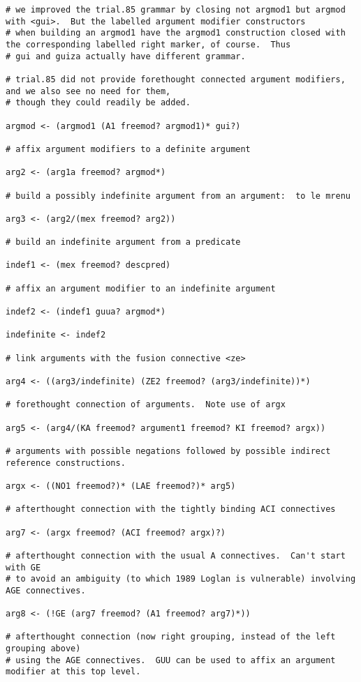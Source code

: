 \documentclass[12pt]{book}
\begin{document}
{\begin{verbatim}
# we improved the trial.85 grammar by closing not argmod1 but argmod with <gui>.  But the labelled argument modifier constructors
# when building an argmod1 have the argmod1 construction closed with the corresponding labelled right marker, of course.  Thus
# gui and guiza actually have different grammar.

# trial.85 did not provide forethought connected argument modifiers, and we also see no need for them,
# though they could readily be added.

argmod <- (argmod1 (A1 freemod? argmod1)* gui?)

# affix argument modifiers to a definite argument

arg2 <- (arg1a freemod? argmod*)

# build a possibly indefinite argument from an argument:  to le mrenu

arg3 <- (arg2/(mex freemod? arg2))

# build an indefinite argument from a predicate

indef1 <- (mex freemod? descpred)

# affix an argument modifier to an indefinite argument

indef2 <- (indef1 guua? argmod*)

indefinite <- indef2

# link arguments with the fusion connective <ze>

arg4 <- ((arg3/indefinite) (ZE2 freemod? (arg3/indefinite))*)

# forethought connection of arguments.  Note use of argx

arg5 <- (arg4/(KA freemod? argument1 freemod? KI freemod? argx))

# arguments with possible negations followed by possible indirect reference constructions.

argx <- ((NO1 freemod?)* (LAE freemod?)* arg5)

# afterthought connection with the tightly binding ACI connectives

arg7 <- (argx freemod? (ACI freemod? argx)?)

# afterthought connection with the usual A connectives.  Can't start with GE
# to avoid an ambiguity (to which 1989 Loglan is vulnerable) involving AGE connectives.

arg8 <- (!GE (arg7 freemod? (A1 freemod? arg7)*))

# afterthought connection (now right grouping, instead of the left grouping above)
# using the AGE connectives.  GUU can be used to affix an argument modifier at this top level.


\end{verbatim}}
\end{document}
